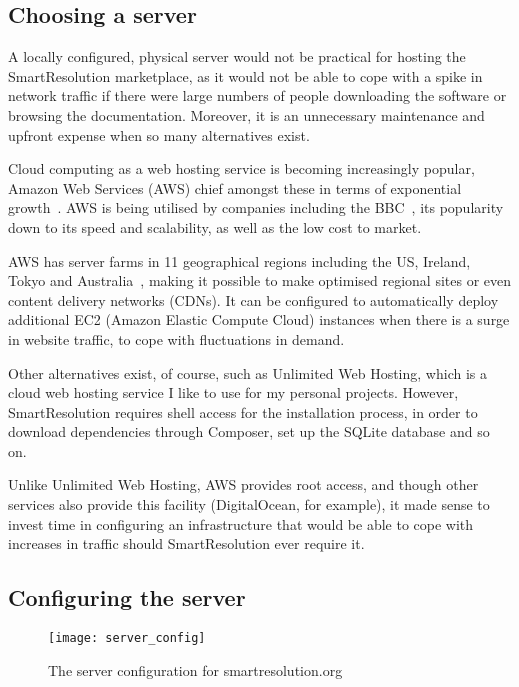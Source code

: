 \subsection{Choosing a server}

A locally configured, physical server would not be practical for hosting the SmartResolution marketplace, as it would not be able to cope with a spike in network traffic if there were large numbers of people downloading the software or browsing the documentation. Moreover, it is an unnecessary maintenance and upfront expense when so many alternatives exist.

Cloud computing as a web hosting service is becoming increasingly popular, Amazon Web Services (AWS) chief amongst these in terms of exponential growth~\cite{article:AWS}. AWS is being utilised by companies including the BBC~\cite{article:bbcAws}, its popularity down to its speed and scalability, as well as the low cost to market.

AWS has server farms in 11 geographical regions including the US, Ireland, Tokyo and Australia~\cite{aws:global}, making it possible to make optimised regional sites or even content delivery networks (CDNs). It can be configured to automatically deploy additional EC2 (Amazon Elastic Compute Cloud) instances when there is a surge in website traffic, to cope with fluctuations in demand.

Other alternatives exist, of course, such as Unlimited Web Hosting, which is a cloud web hosting service I like to use for my personal projects. However, SmartResolution requires shell access for the installation process, in order to download dependencies through Composer, set up the SQLite database and so on.

Unlike Unlimited Web Hosting, AWS provides root access, and though other services also provide this facility (DigitalOcean, for example), it made sense to invest time in configuring an infrastructure that would be able to cope with increases in traffic should SmartResolution ever require it.

\subsection{Configuring the server}

\begin{figure}[h!]
  \centering
    \ifimages
    \texttt{[image: server\_config]}
    \fi
  \caption{The server configuration for smartresolution.org}
  \label{uml:serverConfig}
\end{figure}

